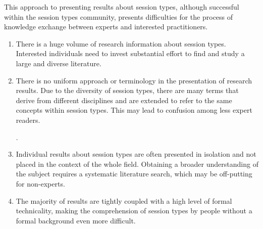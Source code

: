 
This approach to presenting results about session types,
although successful within the session types community,
presents difficulties for the process of knowledge exchange
between experts and interested practitioners.

%
\begin{enumerate}
	\item	There is a huge volume of research information about session types.
			Interested individuals need to invest substantial effort to find
			and study a large and diverse literature.

	\item	There is no uniform approach or terminology
			in the presentation of research results.
			Due to the diversity of session types,
			there are many terms that derive from different
			disciplines and are extended to refer to
			the same concepts within session types.
			This may lead to confusion among less
			expert readers.

			.

	\item	Individual results about session types are often presented in
			isolation and not placed in the context of the whole field.
			Obtaining a broader understanding of the subject requires a systematic
			literature search, which may be off-putting for non-experts.


	\item	The majority of results are tightly coupled
			with a high level of formal technicality, making the
			comprehension of session types by people without
			a formal background even more difficult.
\end{enumerate}
